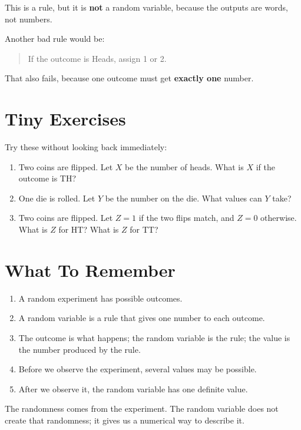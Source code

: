 \documentclass[11pt,a4paper]{article}
\begin{document}
This is a rule, but it is \textbf{not} a random variable, because the outputs are words, not numbers.

Another bad rule would be:

\begin{quote}
If the outcome is Heads, assign 1 or 2.
\end{quote}

That also fails, because one outcome must get \textbf{exactly one} number.

\section{Tiny Exercises}

Try these without looking back immediately:

\begin{enumerate}
  \item Two coins are flipped. Let \(X\) be the number of heads.
  What is \(X\) if the outcome is TH?
  \item One die is rolled. Let \(Y\) be the number on the die.
  What values can \(Y\) take?
  \item Two coins are flipped. Let \(Z=1\) if the two flips match, and \(Z=0\) otherwise.
  What is \(Z\) for HT? What is \(Z\) for TT?
\end{enumerate}

\section{What To Remember}

\begin{enumerate}
  \item A random experiment has possible outcomes.
  \item A random variable is a rule that gives one number to each outcome.
  \item The outcome is what happens; the random variable is the rule; the value is the number produced by the rule.
  \item Before we observe the experiment, several values may be possible.
  \item After we observe it, the random variable has one definite value.
\end{enumerate}

\begin{keypointblock}
The randomness comes from the experiment.
The random variable does not create that randomness; it gives us a numerical way to describe it.
\end{keypointblock}
\end{document}

